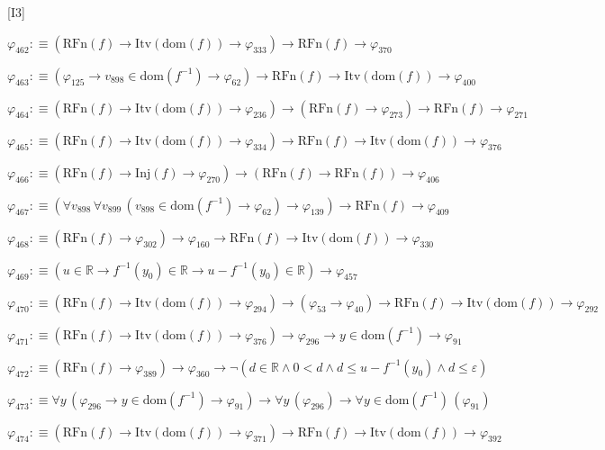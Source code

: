 \begin{fullproof}{[I3]}
\begin{abbrevlist}
\item $\varphi_{462} :\equiv (\mathrm{RFn}(f) \to \mathrm{Itv}(\mathrm{dom}(f)) \to \varphi_{333}) \to \mathrm{RFn}(f) \to \varphi_{370}$
\item $\varphi_{463} :\equiv (\varphi_{125} \to v_{898} \in \mathrm{dom}(f^{-1}) \to \varphi_{62}) \to \mathrm{RFn}(f) \to \mathrm{Itv}(\mathrm{dom}(f)) \to \varphi_{400}$
\item $\varphi_{464} :\equiv (\mathrm{RFn}(f) \to \mathrm{Itv}(\mathrm{dom}(f)) \to \varphi_{236}) \to (\mathrm{RFn}(f) \to \varphi_{273}) \to \mathrm{RFn}(f) \to \varphi_{271}$
\item $\varphi_{465} :\equiv (\mathrm{RFn}(f) \to \mathrm{Itv}(\mathrm{dom}(f)) \to \varphi_{334}) \to \mathrm{RFn}(f) \to \mathrm{Itv}(\mathrm{dom}(f)) \to \varphi_{376}$
\item $\varphi_{466} :\equiv (\mathrm{RFn}(f) \to \mathrm{Inj}(f) \to \varphi_{270}) \to (\mathrm{RFn}(f) \to \mathrm{RFn}(f)) \to \varphi_{406}$
\item $\varphi_{467} :\equiv (\forall v_{898}\,\forall v_{899}\,(v_{898} \in \mathrm{dom}(f^{-1}) \to \varphi_{62}) \to \varphi_{139}) \to \mathrm{RFn}(f) \to \varphi_{409}$
\item $\varphi_{468} :\equiv (\mathrm{RFn}(f) \to \varphi_{302}) \to \varphi_{160} \to \mathrm{RFn}(f) \to \mathrm{Itv}(\mathrm{dom}(f)) \to \varphi_{330}$
\item $\varphi_{469} :\equiv (u \in \mathbb{R} \to f^{-1}(y_{0}) \in \mathbb{R} \to u - f^{-1}(y_{0}) \in \mathbb{R}) \to \varphi_{457}$
\item $\varphi_{470} :\equiv (\mathrm{RFn}(f) \to \mathrm{Itv}(\mathrm{dom}(f)) \to \varphi_{294}) \to (\varphi_{53} \to \varphi_{40}) \to \mathrm{RFn}(f) \to \mathrm{Itv}(\mathrm{dom}(f)) \to \varphi_{292}$
\item $\varphi_{471} :\equiv (\mathrm{RFn}(f) \to \mathrm{Itv}(\mathrm{dom}(f)) \to \varphi_{376}) \to \varphi_{296} \to y \in \mathrm{dom}(f^{-1}) \to \varphi_{91}$
\item $\varphi_{472} :\equiv (\mathrm{RFn}(f) \to \varphi_{389}) \to \varphi_{360} \to \neg (d \in \mathbb{R} \land 0 < d \land d \leq u - f^{-1}(y_{0}) \land d \leq \varepsilon)$
\item $\varphi_{473} :\equiv \forall y\,(\varphi_{296} \to y \in \mathrm{dom}(f^{-1}) \to \varphi_{91}) \to \forall y\,(\varphi_{296}) \to \forall y \in \mathrm{dom}(f^{-1})\,(\varphi_{91})$
\item $\varphi_{474} :\equiv (\mathrm{RFn}(f) \to \mathrm{Itv}(\mathrm{dom}(f)) \to \varphi_{371}) \to \mathrm{RFn}(f) \to \mathrm{Itv}(\mathrm{dom}(f)) \to \varphi_{392}$

\end{abbrevlist}
\end{fullproof}
